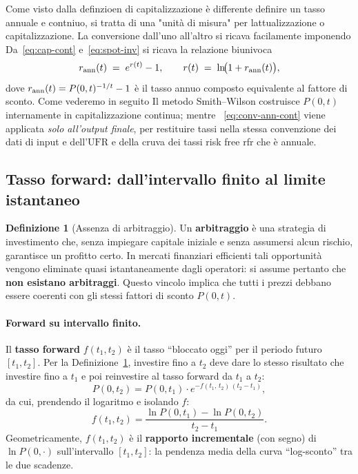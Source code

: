 \documentclass[11pt,a4paper]{article}
\theoremstyle{plain}
\theoremstyle{definition}
\newtheorem{definizione}[teorema]{Definizione}
\theoremstyle{remark}
\newcommand{\UFR}{\ensuremath{\mathrm{UFR}}}
\begin{document}
Come visto dalla definzioen di capitalizzazione è differente definire un tasso annuale e contniuo, si tratta di una "unità di misura" per lattualizzazione o capitalizzazione. La conversione dall'uno all'altro si ricava facilamente imponendo
Da~\eqref{eq:cap-cont} e~\eqref{eq:spot-inv} si ricava la relazione biunivoca
\begin{equation}
  r_{\rm ann}(t) \;=\; e^{r(t)} - 1,
  \qquad
  r(t) \;=\; \ln\!\bigl(1 + r_{\rm ann}(t)\bigr),
  \label{eq:conv-ann-cont}
\end{equation}
dove $r_{\rm ann}(t) = P(0,t)^{-1/t}-1$ \`e il tasso annuo composto equivalente al fattore
di sconto. Come vederemo in seguito Il metodo Smith--Wilson costruisce $P(0,t)$ internamente in capitalizzazione
continua; mentre ~\eqref{eq:conv-ann-cont} viene applicata \emph{solo all'output finale}, per
restituire tassi nella stessa convenzione dei dati di input e dell'$\UFR$ e della cruva dei tassi risk free rfr che è annuale.

\subsection{Tasso forward: dall'intervallo finito al limite istantaneo}


\begin{definizione}[Assenza di arbitraggio]
\label{def:noarb}
Un \textbf{arbitraggio} \`e una strategia di investimento che, senza impiegare capitale
iniziale e senza assumersi alcun rischio, garantisce un profitto certo. In mercati
finanziari efficienti tali opportunit\`a vengono eliminate quasi istantaneamente dagli
operatori: si assume pertanto che \textbf{non esistano arbitraggi}. Questo vincolo implica
che tutti i prezzi debbano essere coerenti con gli stessi fattori di sconto $P(0,t)$.
\end{definizione}

\paragraph{Forward su intervallo finito.}
Il \textbf{tasso forward} $f(t_1, t_2)$ \`e il tasso ``bloccato oggi'' per il periodo
futuro $[t_1, t_2]$. Per la Definizione~\ref{def:noarb}, investire fino a $t_2$ deve dare lo stesso
risultato che investire fino a $t_1$ e poi reinvestire al tasso forward da $t_1$ a $t_2$:
\[
  P(0, t_2) = P(0, t_1) \cdot e^{-f(t_1,\,t_2)\,(t_2-t_1)},
\]
da cui, prendendo il logaritmo e isolando $f$:
\begin{equation}
  f(t_1, t_2) = \frac{\ln P(0,t_1) - \ln P(0,t_2)}{t_2 - t_1}.
  \label{eq:fwd-finito}
\end{equation}
Geometricamente, $f(t_1,t_2)$ \`e il \textbf{rapporto incrementale} (con segno) di
$\ln P(0,\cdot)$ sull'intervallo $[t_1,t_2]$: la pendenza media della curva
``log-sconto'' tra le due scadenze.
\end{document}
